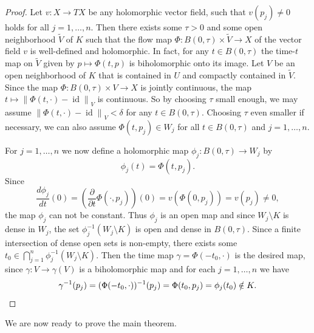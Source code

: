 \documentclass[a4paper,11pt]{amsart}
\newcommand{\norm}[1]{\left\lVert#1\right\rVert}
\DeclareMathOperator{\id}{id}
\begin{document}
\begin{proof}
    Let $v \colon X \to TX$ be any holomorphic vector field, such that $v(p_j) \neq 0$ holds for all $j= 1, \ldots, n$. 
    Then there exists some $\tau > 0$ and some open neighborhood $\widetilde{V}$ of $K$ such that the flow map
    $\Phi \colon B(0,\tau) \times \widetilde{V} \to X$ of the vector field $v$ is well-defined and holomorphic.
    In fact, for any $t \in B(0,\tau)$ the time-$t$ map on $\widetilde{V}$ given by $p \mapsto \Phi(t, p)$ is biholomorphic onto its image.      
    Let $V$ be an open neighborhood of $K$ that is contained in $U$ and compactly contained in $\widetilde{V}$. 
    Since the map $\Phi \colon B(0,\tau) \times V \to X$ is jointly continuous, the map $t \mapsto \norm{\Phi(t, \cdot) - \id}_V$ is continuous.
    So by choosing $\tau$ small enough, we may assume $\norm{\Phi(t, \cdot) - \id}_V < \delta$ for any $t \in B(0,\tau)$.
    Choosing $\tau$ even smaller if necessary, we can also assume $\Phi(t, p_j) \in W_j$ for all $t \in B(0,\tau)$ and $j=1, \ldots, n$.

    For $j=1, \ldots, n$ we now define a holomorphic map $\phi_j \colon B(0,\tau) \to W_j$ by 
    \[\phi_j(t) = \Phi(t, p_j).\]
    Since 
    \[\frac{d \phi_j}{dt} (0) = \left(\frac{\partial}{\partial t} \Phi(\cdot, p_j)\right)(0) = v(\Phi(0,p_j))= v(p_j) \neq 0,\] 
    the map $\phi_j$ can not be constant. Thus $\phi_j$ is an open map and since $W_j \setminus K$ is dense in $W_j$, the set $\phi_j^{-1}(W_j \setminus K)$ is open and dense in $B(0,\tau)$.
    Since a finite intersection of dense open sets is non-empty, there exists some $t_0 \in \bigcap_{j=1}^n \phi_j^{-1}(W_j \setminus K)$.
    Then the time map $\gamma = \Phi(-t_0, \cdot)$ is the desired map, 
    since $\gamma \colon V \to \gamma(V)$ is a biholomorphic map and for each $j=1, \ldots, n$ we have 
    \[\gamma^{-1}(p_j) = (\Phi(-t_0, \cdot))^{-1}(p_j) = \Phi(t_0, p_j) = \phi_j(t_0) \notin K. \qedhere\]
\end{proof}

We are now ready to prove the main theorem.
\end{document}
